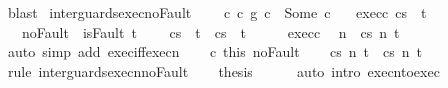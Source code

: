 \begin{isabellebody}
\ blast\isanewline
{}\isamarkupfalse%
%
\endisatagproof
{\isafoldproof}%
%
\isadelimproof
\isanewline
%
\endisadelimproof
\isanewline
{}\isamarkupfalse%
\ inter{\isacharunderscore}guards{\isacharunderscore}exec{\isacharunderscore}noFault{\isacharcolon}\ \isanewline
\ \ \ c{\isacharcolon}\ {\isachardoublequoteopen}{\isacharparenleft}c{}\ {\isasyminter}\isactrlsub g\ c{}{\isacharparenright}\ {\isacharequal}\ Some\ c{\isachardoublequoteclose}\isanewline
\ \ \ exec{\isacharunderscore}c{\isacharcolon}\ {\isachardoublequoteopen}{\isasymGamma}{\isasymturnstile}{\isasymlangle}c{\isacharcomma}s{\isasymrangle}\ {\isasymRightarrow}\ t{\isachardoublequoteclose}\isanewline
\ \ \ noFault{\isacharcolon}\ {\isachardoublequoteopen}{\isasymnot}\ isFault\ t{\isachardoublequoteclose}\ \isanewline
\ \ \ {\isachardoublequoteopen}{\isasymGamma}{\isasymturnstile}{\isasymlangle}c{}{\isacharcomma}s{\isasymrangle}\ {\isasymRightarrow}\ t\ {\isasymand}\ {\isasymGamma}{\isasymturnstile}{\isasymlangle}c{}{\isacharcomma}s{\isasymrangle}\ {\isasymRightarrow}\ t{\isachardoublequoteclose}\isanewline
%
\isadelimproof
%
\endisadelimproof
%
\isatagproof
{}\isamarkupfalse%
\ {\isacharminus}\isanewline
\ \ \isamarkupfalse%
\ exec{\isacharunderscore}c\ \isamarkupfalse%
\ n\ \ {\isachardoublequoteopen}{\isasymGamma}{\isasymturnstile}{\isasymlangle}c{\isacharcomma}s{\isasymrangle}\ {\isacharequal}n{\isasymRightarrow}\ t{\isachardoublequoteclose}\isanewline
\ \ \ \ \isamarkupfalse%
\ {\isacharparenleft}auto\ simp\ add{\isacharcolon}\ exec{\isacharunderscore}iff{\isacharunderscore}execn{\isacharparenright}\isanewline
\ \ \isamarkupfalse%
\ c\ this\ noFault\isanewline
\ \ \isamarkupfalse%
\ {\isachardoublequoteopen}{\isasymGamma}{\isasymturnstile}{\isasymlangle}c{}{\isacharcomma}s{\isasymrangle}\ {\isacharequal}n{\isasymRightarrow}\ t\ {\isasymand}\ {\isasymGamma}{\isasymturnstile}{\isasymlangle}c{}{\isacharcomma}s{\isasymrangle}\ {\isacharequal}n{\isasymRightarrow}\ t{\isachardoublequoteclose}\isanewline
\ \ \ \ \isamarkupfalse%
\ {\isacharparenleft}rule\ inter{\isacharunderscore}guards{\isacharunderscore}execn{\isacharunderscore}noFault{\isacharparenright}\isanewline
\ \ \isamarkupfalse%
\ {\isacharquery}thesis\isanewline
\ \ \ \ \isamarkupfalse%
\ {\isacharparenleft}auto\ intro{\isacharcolon}\ execn{\isacharunderscore}to{\isacharunderscore}exec{\isacharparenright}\isanewline

\end{isabellebody}
